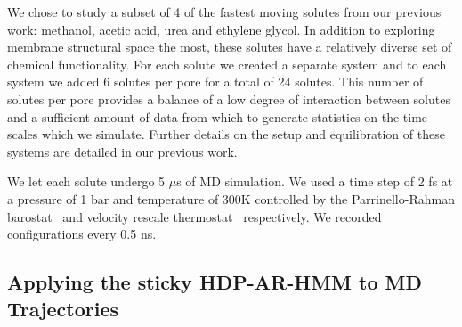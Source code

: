 \documentclass[journal=jpcbfk,manuscript=article]{achemso}
\begin{document}
  We chose to study a subset of 4 of the fastest moving solutes from our previous
  work: methanol, acetic acid, urea and ethylene glycol.
  In addition to exploring membrane structural space the most, these solutes have a
  relatively diverse set of chemical functionality. For each solute we created a 
  separate system and to each system we added 6 solutes per pore for a total of 24 solutes. This number 
  of solutes per pore provides a balance of a low degree of interaction between 
  solutes and a sufficient amount of data from which to generate statistics on the
  time scales which we simulate. Further details on the setup and equilibration of
  these systems are detailed in our previous work.\cite{coscia_chemically_2019}
  
  We let each solute undergo 5 $\mu$s of MD simulation. We used a time step of 2 fs
  at a pressure of 1 bar and temperature of 300K controlled by the Parrinello-Rahman 
  barostat~\cite{parrinello_polymorphic_1981} and velocity rescale 
  thermostat~\cite{bussi_canonical_2007} respectively. We recorded configurations every 0.5 ns.

  \subsection{Applying the sticky HDP-AR-HMM to MD Trajectories}\label{method:HDP-AR-HMM}

  
  
  
\end{document}
